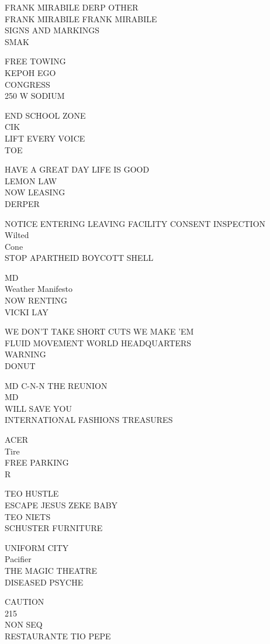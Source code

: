 \documentclass[10pt,letterpaper]{article}
\begin{document}
FRANK MIRABILE DERP OTHER\\
FRANK MIRABILE FRANK MIRABILE\\
SIGNS AND MARKINGS\\
SMAK

FREE TOWING\\
KEPOH EGO\\
CONGRESS\\
250 W SODIUM

END SCHOOL ZONE\\
CIK\\
LIFT EVERY VOICE\\
TOE

HAVE A GREAT DAY LIFE IS GOOD\\
LEMON LAW\\
NOW LEASING\\
DERPER

NOTICE ENTERING LEAVING FACILITY CONSENT INSPECTION\\
Wilted\\
Cone\\
STOP APARTHEID BOYCOTT SHELL

MD\\
Weather Manifesto\\
NOW RENTING\\
VICKI LAY

WE DON'T TAKE SHORT CUTS WE MAKE 'EM\\
FLUID MOVEMENT WORLD HEADQUARTERS\\
WARNING\\
DONUT

MD C{-}N{-}N THE REUNION\\
MD\\
WILL SAVE YOU\\
INTERNATIONAL FASHIONS TREASURES

ACER\\
Tire\\
FREE PARKING\\
R

TEO HUSTLE\\
ESCAPE JESUS ZEKE BABY\\
TEO NIETS\\
SCHUSTER FURNITURE

UNIFORM CITY\\
Pacifier\\
THE MAGIC THEATRE\\
DISEASED PSYCHE

CAUTION\\
215\\
NON SEQ\\
RESTAURANTE TIO PEPE
\end{document}
